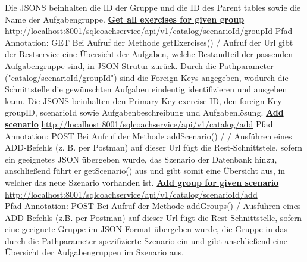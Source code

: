 \documentclass[fleqn,10pt,ngerman]{SelfArx}
\begin{document}
	Die JSONS beinhalten die ID der Gruppe und die ID des Parent tables sowie die Name der Aufgabengruppe.
	\newline\newline
	\underline{\textbf{Get all exercises for given group}}\newline
	\underline{http://localhost:8001/sqlcoachservice/api/v1/catalog}\newline\underline{/{scenarioId}/{groupId}}\newline
		Pfad Annotation: GET\newline
	Bei Aufruf der Methode getExercises() / Aufruf der Url gibt der Restservice eine Übersicht der Aufgaben, welche Bestandteil der passenden Aufgabengruppe sind, in JSON-Strutur zurück.
	Durch die Pathparameter ("catalog/{scenarioId}/{groupId}") sind die Foreign Keys angegeben, wodurch die Schnittstelle die gewünschten Aufgaben eindeutig identifizieren und ausgeben kann.
	Die JSONS beinhalten den Primary Key exercise ID, den foreign Key groupID, scenarioId sowie Aufgabenbeschreibung und Aufgabenlösung.
	\newline\newline
	\underline{\textbf{Add scenario}}\newline
	\underline{http://localhost:8001/sqlcoachservice/api/v1/catalog/add}\newline
	Pfad Annotation: POST\newline
	Bei Aufruf der Methode addScenario() / / Ausführen eines ADD-Befehls (z. B. per Postman) auf dieser Url  fügt die Rest-Schnittstele, sofern ein geeignetes JSON übergeben wurde, das Szenario der Datenbank hinzu, anschließend führt er getScenario() aus und gibt somit eine Übersicht aus, in welcher das neue Szenario vorhanden ist.\newline\newline
		\underline{\textbf{Add group for given scenario}}\newline
	\noindent\underline{http://localhost:8001/sqlcoachservice/api/v1/catalog}\newline\underline{{/scenarioId}/add}\newline\\
		Pfad Annotation: POST\newline
	Bei Aufruf der Methode addGroups() / Ausführen eines ADD-Befehls (z.B. per Postman) auf dieser Url fügt die Rest-Schnittstelle, sofern eine geeignete Gruppe im JSON-Format übergeben wurde, die Gruppe in das durch die Pathparameter spezifizierte Szenario ein und gibt anschließend eine Übersicht der Aufgabengruppen im Szenario aus.
	\newline\newline
	
\end{document}

